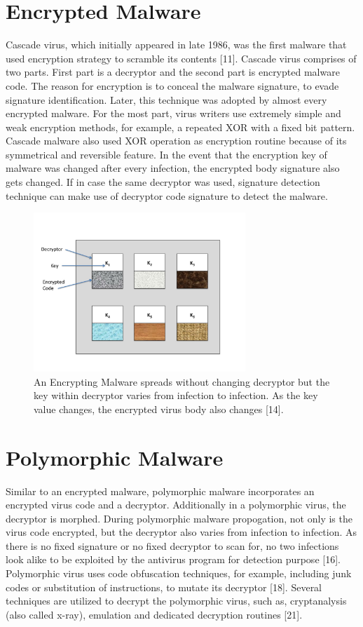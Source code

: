 \section{Encrypted Malware} 

Cascade virus, which initially appeared in late 1986, was the first malware that used encryption strategy to scramble its contents [11]. Cascade virus comprises of two parts. First part is a decryptor and the second part is encrypted malware code. The reason for encryption is to conceal the malware signature, to evade signature identification. Later, this technique was adopted by almost every encrypted malware.  For the most part, virus writers use extremely simple and weak encryption methods, for example, a repeated XOR with a fixed bit pattern. Cascade malware also used XOR operation as encryption routine because of its symmetrical and reversible feature. In the event that the encryption key of malware was changed after every infection, the encrypted body signature also gets changed. If in case the same decryptor was used, signature detection technique can make use of decryptor code signature to detect the malware.
\begin{figure}
    \centering    
    \includegraphics[width=8cm, height=6cm]{encryptedvirus.jpg}
    \caption[Encrypted Malware Replication]{An Encrypting Malware spreads without changing decryptor but the key within decryptor varies from infection to infection. As the key value changes, the encrypted virus body also changes [14].}
\end{figure}
\section{Polymorphic Malware} 

Similar to an encrypted malware, polymorphic malware incorporates an encrypted virus code and a decryptor. Additionally in a polymorphic virus, the decryptor is morphed. During polymorphic malware propogation, not only is the virus code encrypted, but the decryptor also varies from infection to infection. As there is no fixed signature or no fixed decryptor to scan for, no two infections look alike to be exploited by the antivirus program for detection purpose [16]. Polymorphic virus uses code obfuscation techniques, for example, including junk codes or substitution of instructions, to mutate its decryptor [18].
Several techniques are utilized to decrypt the polymorphic virus, such as, cryptanalysis (also called x-ray), emulation and dedicated decryption routines [21].

